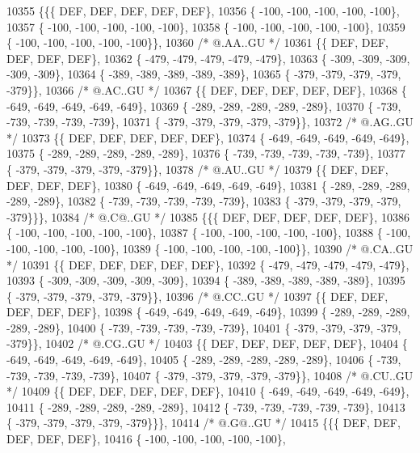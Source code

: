 \begin{DoxyCode}
10355 \{\{\{  DEF,  DEF,  DEF,  DEF,  DEF\},
10356 \{ -100, -100, -100, -100, -100\},
10357 \{ -100, -100, -100, -100, -100\},
10358 \{ -100, -100, -100, -100, -100\},
10359 \{ -100, -100, -100, -100, -100\}\},
10360 \textcolor{comment}{/*  @.AA..GU */}
10361 \{\{  DEF,  DEF,  DEF,  DEF,  DEF\},
10362 \{ -479, -479, -479, -479, -479\},
10363 \{ -309, -309, -309, -309, -309\},
10364 \{ -389, -389, -389, -389, -389\},
10365 \{ -379, -379, -379, -379, -379\}\},
10366 \textcolor{comment}{/*  @.AC..GU */}
10367 \{\{  DEF,  DEF,  DEF,  DEF,  DEF\},
10368 \{ -649, -649, -649, -649, -649\},
10369 \{ -289, -289, -289, -289, -289\},
10370 \{ -739, -739, -739, -739, -739\},
10371 \{ -379, -379, -379, -379, -379\}\},
10372 \textcolor{comment}{/*  @.AG..GU */}
10373 \{\{  DEF,  DEF,  DEF,  DEF,  DEF\},
10374 \{ -649, -649, -649, -649, -649\},
10375 \{ -289, -289, -289, -289, -289\},
10376 \{ -739, -739, -739, -739, -739\},
10377 \{ -379, -379, -379, -379, -379\}\},
10378 \textcolor{comment}{/*  @.AU..GU */}
10379 \{\{  DEF,  DEF,  DEF,  DEF,  DEF\},
10380 \{ -649, -649, -649, -649, -649\},
10381 \{ -289, -289, -289, -289, -289\},
10382 \{ -739, -739, -739, -739, -739\},
10383 \{ -379, -379, -379, -379, -379\}\}\},
10384 \textcolor{comment}{/*  @.C@..GU */}
10385 \{\{\{  DEF,  DEF,  DEF,  DEF,  DEF\},
10386 \{ -100, -100, -100, -100, -100\},
10387 \{ -100, -100, -100, -100, -100\},
10388 \{ -100, -100, -100, -100, -100\},
10389 \{ -100, -100, -100, -100, -100\}\},
10390 \textcolor{comment}{/*  @.CA..GU */}
10391 \{\{  DEF,  DEF,  DEF,  DEF,  DEF\},
10392 \{ -479, -479, -479, -479, -479\},
10393 \{ -309, -309, -309, -309, -309\},
10394 \{ -389, -389, -389, -389, -389\},
10395 \{ -379, -379, -379, -379, -379\}\},
10396 \textcolor{comment}{/*  @.CC..GU */}
10397 \{\{  DEF,  DEF,  DEF,  DEF,  DEF\},
10398 \{ -649, -649, -649, -649, -649\},
10399 \{ -289, -289, -289, -289, -289\},
10400 \{ -739, -739, -739, -739, -739\},
10401 \{ -379, -379, -379, -379, -379\}\},
10402 \textcolor{comment}{/*  @.CG..GU */}
10403 \{\{  DEF,  DEF,  DEF,  DEF,  DEF\},
10404 \{ -649, -649, -649, -649, -649\},
10405 \{ -289, -289, -289, -289, -289\},
10406 \{ -739, -739, -739, -739, -739\},
10407 \{ -379, -379, -379, -379, -379\}\},
10408 \textcolor{comment}{/*  @.CU..GU */}
10409 \{\{  DEF,  DEF,  DEF,  DEF,  DEF\},
10410 \{ -649, -649, -649, -649, -649\},
10411 \{ -289, -289, -289, -289, -289\},
10412 \{ -739, -739, -739, -739, -739\},
10413 \{ -379, -379, -379, -379, -379\}\}\},
10414 \textcolor{comment}{/*  @.G@..GU */}
10415 \{\{\{  DEF,  DEF,  DEF,  DEF,  DEF\},
10416 \{ -100, -100, -100, -100, -100\},

\end{DoxyCode}

